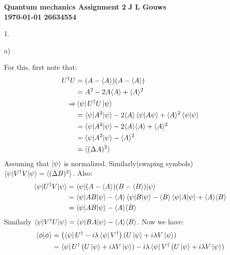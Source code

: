 \documentclass[a4paper,12pt]{article}
\newcommand\block[1]{\hspace*{#1}}
\begin{document}
\selectfont
{\Large \textbf{Quantum mechanics Assignment 2}} \hfill {\Large \textbf{J L Gouws}}\\
\block{1.0cm} {\large \textbf{\today}} \hfill {\large \textbf{26634554}}\\
\thispagestyle{empty}

1.
\begin{minipage}[t]{0.90\textwidth}
  a)
  \begin{minipage}[t]{\textwidth}
    For this, first note that:
    \begin{align*}
      U^\dagger U &= (A - \langle A \rangle) (A - \langle A \rangle)\\
                  &= A^2 -2 A\langle A\rangle + \langle A \rangle^2\\
      \Rightarrow & \bra{\psi} U^\dagger U \ket{\psi}\\
                  & = \braket{\psi|A^2|\psi} - 2\langle A \rangle \braket{\psi|A\psi} + \langle A \rangle^2 \braket{\psi|\psi}\\
                  & = \braket{\psi|A^2|\psi} - 2\langle A \rangle \langle A \rangle + \langle A \rangle^2 \\
                  & = \braket{\psi|A^2|\psi} - \langle A \rangle^2\\
                  & = \langle (\Delta A)^2 \rangle 
    \end{align*}
    Assuming that $\ket{\psi}$ is normalized. Similarly(swaping symbols) $ \braket{\psi|V^\dagger V|\psi} = \langle (\Delta B )^2 \rangle$. Also:
    \begin{align*}
     \braket{\psi | U^\dagger V|\psi} &= \braket{\psi |(A - \langle A \rangle) (B - \langle B \rangle)|\psi}\\
                  &= \braket{\psi|A B|\psi} - \langle A \rangle \braket{\psi|B| \psi}- \langle B \rangle \braket{\psi|A|\psi} + \langle A \rangle \langle B \rangle \\
                  &= \braket{\psi|A B|\psi} - \langle A \rangle \langle B \rangle
    \end{align*}
    Similarly $\braket{\psi | V^\dagger U|\psi} = \braket{\psi|B A|\psi} - \langle A \rangle \langle B \rangle $. Now we have:
    \begin{align*}
      \braket{\phi|\phi} &= \left(\bra{\psi} U^\dagger - i\lambda\bra{\psi}V^\dagger \right) \left(U\ket{\psi} + i\lambda V\ket{\psi}\right)\\
                         &= \bra{\psi} U^\dagger \left(U\ket{\psi} + i\lambda V\ket{\psi}\right)- i\lambda \bra{\psi}V^\dagger \left(U\ket{\psi} + i\lambda V \ket{\psi}\right)\\

\end{align*}
\end{minipage}
\end{minipage}
\end{document}
